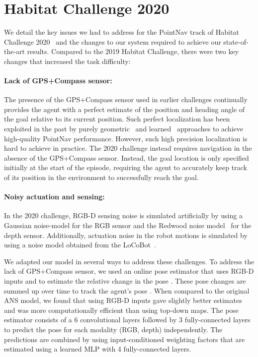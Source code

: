 \documentclass[runningheads]{llncs}
\begin{document}
\section{Habitat Challenge 2020}
\label{sec:habitat_challenge_2020}
We detail the key issues we had to address for the PointNav track of Habitat Challenge 2020~\cite{habitat-challenge} and the changes to our system required to achieve our state-of-the-art results. Compared to the 2019 Habitat Challenge, there were two key changes that increased the task difficulty:

\paragraph{Lack of GPS+Compass sensor:}
The presence of the GPS+Compass sensor used in earlier challenges continually provides the agent with a perfect estimate of the position and heading angle of the goal relative to its current position. Such perfect localization has been exploited in the past by purely geometric~\cite{gupta2017cognitive} and learned~\cite{wijmans2019decentralized} approaches to achieve high-quality PointNav performance. However, such high precision localization is hard to achieve in practice. The 2020 challenge instead requires navigation in the absence of the GPS+Compass sensor. Instead, the goal location is only specified initially at the start of the episode, requiring the agent to accurately keep track of its position in the environment to successfully reach the goal.

\paragraph{Noisy actuation and sensing:} In the 2020 challenge, RGB-D sensing noise is simulated artificially by using a Gaussian noise-model for the RGB sensor and the Redwood noise model~\cite{Choi_2015_CVPR} for the depth sensor. Additionally, actuation noise in the robot motions is simulated by using a noise model obtained from the LoCoBot~\cite{pyrobot2019}.

We adapted our model in several ways to address these challenges. To address the lack of GPS+Compass sensor, we used an online pose estimator that uses RGB-D inputs  and  to estimate the relative change in the pose . These pose changes are summed up over time to track the agent's pose . When compared to the original ANS model, we found that using RGB-D inputs gave slightly better estimates and was more computationally efficient than using top-down maps. The pose estimator consists of a 6 convolutional layers followed by 3 fully-connected layers to predict the pose for each modality (RGB, depth) independently. The predictions are combined by using input-conditioned weighting factors that are estimated using a learned MLP with 4 fully-connected layers.
\end{document}
